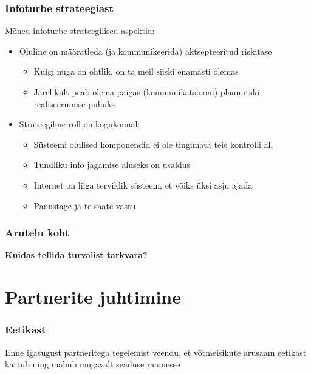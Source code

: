 \begin{frame}[fragile]
  \frametitle{Infoturbe strateegiast}
	Mõned infoturbe strateegilised aspektid:
	\begin{itemize}
		\item Oluline on määratleda (ja kommunikeerida) aktsepteeritud riskitase
		\begin{itemize}
			\item Kuigi nuga on ohtlik, on ta meil siiski enamasti olemas
			\item Järelikult peab olema paigas (kommunikatsiooni) plaan riski realiseerumise puhuks
		\end{itemize}
		\item Strateegiline roll on kogukonnal:
		\begin{itemize}
			\item Süsteemi olulised komponendid ei ole tingimata teie kontrolli all
			\item Tundliku info jagamise aluseks on usaldus
			\item Internet on liiga terviklik süsteem, et võiks üksi asju ajada
			\item Panustage ja te saate vastu
		\end{itemize}

	\end{itemize}
\end{frame}


\begin{frame}[fragile]
  \frametitle{Arutelu koht}
		\begin{center}
			\textbf{Kuidas tellida turvalist tarkvara?}
		\end{center}
\end{frame}


\section{Partnerite juhtimine}
\begin{frame}[fragile]
  \frametitle{Eetikast}
	\begin{center}
		Enne igasugust partneritega tegelemist veendu, et võtmeisikute arusaam eetikast kattub ning mahub mugavalt seaduse raamesse 
	\end{center}
\end{frame}

